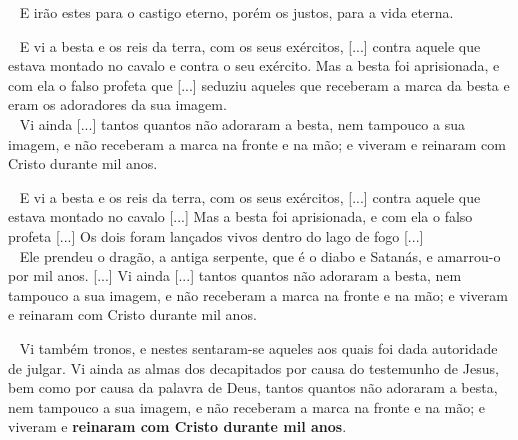 \documentclass[12pt,aspectratio=169]{beamer}
\newcommand{\ver}[1]{%
    \raisebox{0.50ex}{%
        \scalebox{1.1}{%
            \pmb{\textbf{\textcolor{BSpbg}{#1}}}%
        }%
    }%
}
\newcommand{\QUOTE}[1]{%
    \par\noindent\hspace*{0.1\linewidth}%
    \begin{minipage}{0.8\linewidth}%
        \linespread{1.35}\large{#1}%
    \end{minipage}%
}
\newcommand{\WIDEQUOTE}[1]{%
    \par\noindent\hspace*{0.02\linewidth}%
    \begin{minipage}{0.92\linewidth}%
        \linespread{1.25}\large{#1}%
    \end{minipage}%
}
\newcommand{\RED}[1]{{\textcolor{TXred}{#1}}}
\newcommand{\ORA}[1]{{\textcolor{TXora}{#1}}}
\newcommand{\YEL}[1]{{\textcolor{TXyel}{#1}}}
\newcommand{\GRE}[1]{{\textcolor{TXgre}{#1}}}
\newcommand{\MAG}[1]{{\textcolor{TXmag}{#1}}}
\newcommand{\BRI}[1]{{\textcolor{BSpbg}{#1}}}   %
\begin{document}
    \begin{frame}
        \QUOTE{%
            \ver{(ARA) Mt~25.46}~%
            E irão estes para o \RED{castigo eterno}, porém  os  justos,  para  a  \GRE{vida
            eterna}.
        }
    \end{frame}

    \begin{frame}
        \WIDEQUOTE{%
            \ver{(ARA) Ap~19.19,20}~%
            E vi a \YEL{besta} e os reis da terra,  com  os  seus  exércitos,  [...]  contra
            \BRI{aquele que estava montado no  cavalo}  e  contra  o  seu  exército.  Mas  a
            \YEL{besta} foi aprisionada, e com ela o \ORA{falso profeta} que  [...]  seduziu
            aqueles que receberam a \MAG{marca da besta} e eram os  adoradores  da  \GRE{sua
            imagem}. \\[\bigskipamount]
            \ver{(ARA) Ap~20.4}~%
            Vi ainda [...] tantos  quantos  não  adoraram  a  \YEL{besta},  nem  tampouco  a
            \GRE{sua imagem},  e  não  receberam  a  \MAG{marca  na  fronte  e  na  mão};  e
            \BRI{viveram e reinaram com Cristo durante mil anos}.
        }
    \end{frame}

    \begin{frame}
        \WIDEQUOTE{%
            \ver{(ARA) Ap~19.19,20}~%
            E vi a \YEL{besta} e os reis da terra,  com  os  seus  exércitos,  [...]  contra
            \BRI{aquele  que  estava  montado  no  cavalo}  [...]  Mas  a  \YEL{besta}   foi
            aprisionada, e com ela o \ORA{falso profeta}  [...]  Os  \YEL{do}\ORA{is}  foram
            lançados vivos dentro do lago de fogo [...]
            \\[\bigskipamount]
            \ver{(ARA) Ap~20.2,4}~%
            Ele prendeu o \RED{dragão}, a \RED{antiga  serpente},  que  é  o  \RED{diabo}  e
            \RED{Satanás}, e amarrou-o por mil anos. [...] Vi ainda [...] tantos quantos não
            adoraram a \YEL{besta}, nem tampouco a  \GRE{sua  imagem},  e  não  receberam  a
            \MAG{marca na fronte e na mão}; e \BRI{viveram e reinaram com Cristo durante mil
            anos}.
        }
    \end{frame}

    \begin{frame}
        \QUOTE{%
            \ver{(ARA) Ap~20.4}~%
            Vi também tronos, e nestes sentaram-se aqueles aos quais foi dada autoridade  de
            julgar. Vi ainda as almas dos decapitados por causa do testemunho de Jesus,  bem
            como por causa da palavra de Deus, tantos quantos  não  adoraram  a  besta,  nem
            tampouco a sua  imagem,  e  não  receberam  a  marca  na  fronte  e  na  mão;  e
            \BRI{viveram e \textbf{reinaram com Cristo durante mil anos}}.
        }
    \end{frame}
\end{document}
